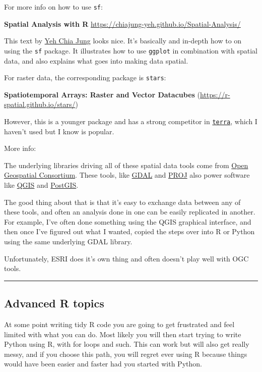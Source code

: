 \documentclass[
]{article}
\begin{document}
For more info on how to use \texttt{sf}:

\textbf{Spatial Analysis with R}
\url{https://chiajung-yeh.github.io/Spatial-Analysis/}

This text by \href{https://github.com/chiajung-yeh}{Yeh Chia Jung} looks
nice. It's basically and in-depth how to on using the \texttt{sf}
package. It illustrates how to use \texttt{ggplot} in combination with
spatial data, and also explains what goes into making data spatial.

For raster data, the corresponding package is \texttt{stars}:

\textbf{Spatiotemporal Arrays: Raster and Vector Datacubes}
(\url{https://r-spatial.github.io/stars/})

However, this is a younger package and has a strong competitor in
\href{https://rspatial.org/terra/pkg/index.html}{\texttt{terra}}, which
I haven't used but I know is popular.

More info:

The underlying libraries driving all of these spatial data tools come
from \href{https://www.osgeo.org/partners/ogc/}{Open Geospatial
Consortium}. These tools, like \href{https://gdal.org/}{GDAL} and
\href{https://proj.org/}{PROJ} also power software like
\href{https://www.qgis.org/en/site/}{QGIS} and
\href{https://postgis.net/}{PostGIS}.

The good thing about that is that it's easy to exchange data between any
of these tools, and often an analysis done in one can be easily
replicated in another. For example, I've often done something using the
QGIS graphical interface, and then once I've figured out what I wanted,
copied the steps over into R or Python using the same underlying GDAL
library.

Unfortunately, ESRI does it's own thing and often doesn't play well with
OGC tools.

\begin{center}\rule{0.5\linewidth}{0.5pt}\end{center}

\hypertarget{advanced-r-topics}{%
\subsection{Advanced R topics}\label{advanced-r-topics}}

At some point writing tidy R code you are going to get frustrated and
feel limited with what you can do. Most likely you will then start
trying to write Python using R, with for loops and such. This can work
but will also get really messy, and if you choose this path, you will
regret ever using R because things would have been easier and faster had
you started with Python.
\end{document}
